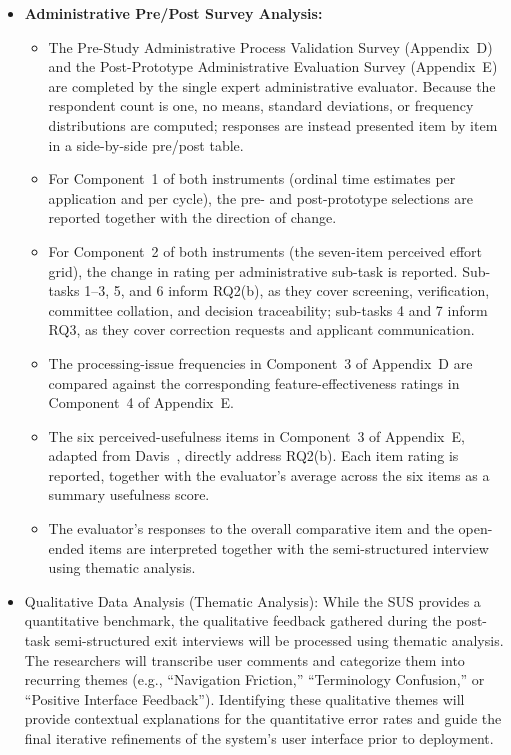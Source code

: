 \begin{itemize}
\begin{itemize}
  \end{itemize}
  \item \textbf{Administrative Pre/Post Survey Analysis:}
  \begin{itemize}
    \item The Pre-Study Administrative Process Validation Survey
    (Appendix~D) and the Post-Prototype Administrative Evaluation Survey
    (Appendix~E) are completed by the single expert administrative
    evaluator. Because the respondent count is one, no means, standard
    deviations, or frequency distributions are computed; responses are
    instead presented item by item in a side-by-side pre/post table.
    \item For Component~1 of both instruments (ordinal time estimates per
    application and per cycle), the pre- and post-prototype selections are
    reported together with the direction of change.
    \item For Component~2 of both instruments (the seven-item perceived
    effort grid), the change in rating per administrative sub-task is
    reported. Sub-tasks 1--3, 5, and 6 inform RQ2(b), as they cover
    screening, verification, committee collation, and decision
    traceability; sub-tasks 4 and 7 inform RQ3, as they cover correction
    requests and applicant communication.
    \item The processing-issue frequencies in Component~3 of Appendix~D
    are compared against the corresponding feature-effectiveness ratings
    in Component~4 of Appendix~E.
    \item The six perceived-usefulness items in Component~3 of Appendix~E,
    adapted from Davis~\cite{ref51}, directly address RQ2(b). Each item
    rating is reported, together with the evaluator's average across the
    six items as a summary usefulness score.
    \item The evaluator's responses to the overall comparative item and the
    open-ended items are interpreted together with the semi-structured
    interview using thematic analysis.
  \end{itemize}
  \item Qualitative Data Analysis (Thematic Analysis): While the SUS provides a quantitative benchmark, the qualitative feedback gathered during the post-task semi-structured exit interviews will be processed using thematic analysis. The researchers will transcribe user comments and categorize them into recurring themes (e.g., ``Navigation Friction,'' ``Terminology Confusion,'' or ``Positive Interface Feedback''). Identifying these qualitative themes will provide contextual explanations for the quantitative error rates and guide the final iterative refinements of the system's user interface prior to deployment.
\end{itemize}

